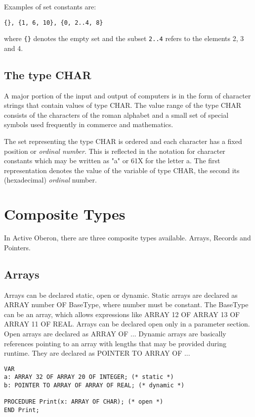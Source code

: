 \documentclass[a4paper,11pt]{article}
\begin{document}
Examples of set constants are:
\begin{lstlisting}[language=Oberon,frame=none]
{}, {1, 6, 10}, {0, 2..4, 8}
\end{lstlisting}

where \verb+{}+ denotes the empty set and the subset \verb+2..4+ refers to the elements 2, 3 and 4.

\subsection{The type CHAR}
A major portion of the input and output of computers is in the form of character strings that contain values of type CHAR. The value range of the type CHAR consists of the characters of the roman alphabet and a small set of special symbols used frequently in commerce and mathematics.

The set representing the type CHAR is ordered and each character has a fixed position or {\em ordinal number}. This is reflected in the notation for character constants which may be written as "a" or 61X for the letter a. The first representation denotes the value of the variable of type CHAR, the second its (hexadecimal) {\em ordinal} number.

\section{Composite Types}\label{section:CompositeTypes}

In Active Oberon, there are three composite types available. Arrays, Records and Pointers. 

\subsection{Arrays}
Arrays can be declared static, open or dynamic. Static arrays are declared as ARRAY number OF BaseType, where number must be constant. The BaseType can be an array, which allows expressions like ARRAY 12 OF ARRAY 13 OF ARRAY 11 OF REAL. Arrays can be declared open only in a parameter section. Open arrays are declared as ARRAY OF ...  Dynamic arrays are basically references pointing to an array with lengths that may be provided during runtime. They are declared as POINTER TO ARRAY OF ...
\begin{lstlisting}[language=Oberon,frame=none]
VAR 
a: ARRAY 32 OF ARRAY 20 OF INTEGER; (* static *)
b: POINTER TO ARRAY OF ARRAY OF REAL; (* dynamic *)
    
PROCEDURE Print(x: ARRAY OF CHAR); (* open *) 
END Print; 
\end{lstlisting}   
\end{document}
